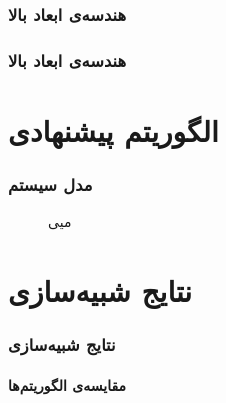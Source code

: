 \begin{frame}
\frametitle{هندسه‌ی ابعاد بالا}
\framesubtitle{}
\end{frame}

\begin{frame}
\frametitle{هندسه‌ی ابعاد بالا}
\framesubtitle{}
\end{frame}


\section{الگوریتم پیشنهادی\hfill}

\begin{frame}
\frametitle{مدل سیستم}

\begin{figure}[t]
	\centering
	
	\caption{میی}
	\label{fig:AdaptiveBD}
\end{figure}
\end{frame}


\section{نتایج شبیه‌سازی\hfill}

\begin{frame}
\frametitle{نتایج شبیه‌سازی}
\framesubtitle{مقایسه‌ی الگوریتم‌ها}
\end{frame}


